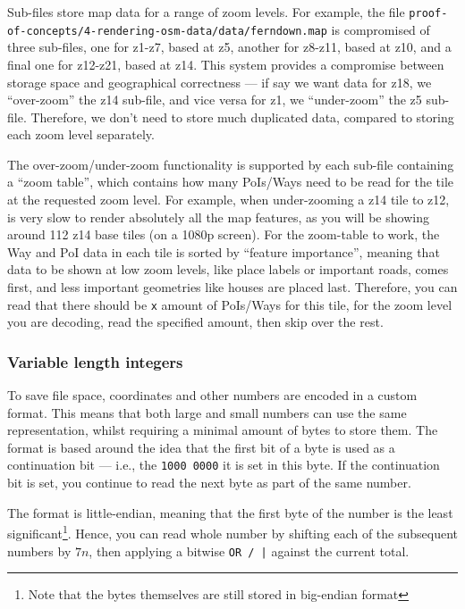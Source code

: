 \documentclass{final_report}
\begin{document}

Sub-files store map data for a range of zoom levels. For example, the file \texttt{proof\--of\--concepts/4\--rendering\--osm\--data\-/data/ferndown.map} is compromised of three sub-files, one for z1-z7, based at z5, another for z8-z11, based at z10, and a final one for z12-z21, based at z14. This system provides a compromise between storage space and geographical correctness --- if say we want data for z18, we ``over-zoom'' the z14 sub-file, and vice versa for z1, we ``under-zoom'' the z5 sub-file. Therefore, we don't need to store much duplicated data, compared to storing each zoom level separately.

The over-zoom/under-zoom functionality is supported by each sub-file containing a ``zoom table'', which contains how many PoIs/Ways need to be read for the tile at the requested zoom level. For example, when under-zooming a z14 tile to z12, is very slow to render absolutely all the map features, as you will be showing around 112 z14 base tiles (on a 1080p screen). For the zoom-table to work, the Way and PoI data in each tile is sorted by ``feature importance'', meaning that data to be shown at low zoom levels, like place labels or important roads, comes first, and less important geometries like houses are placed last. Therefore, you can read that there should be \texttt{x} amount of PoIs/Ways for this tile, for the zoom level you are decoding, read the specified amount, then skip over the rest.

\subsubsection{Variable length integers}

To save file space, coordinates and other numbers are encoded in a custom format. This means that both large and small numbers can use the same representation, whilst requiring a minimal amount of bytes to store them. The format is based around the idea that the first bit of a byte is used as a continuation bit --- i.e., the \texttt{1000 0000} it is set in this byte. If the continuation bit is set, you continue to read the next byte as part of the same number.

The format is little-endian, meaning that the first byte of the number is the least significant\footnote{Note that the bytes themselves are still stored in big-endian format}. Hence, you can read whole number by shifting each of the subsequent numbers by \(7n\), then applying a bitwise \texttt{OR / |} against the current total.
\end{document}

